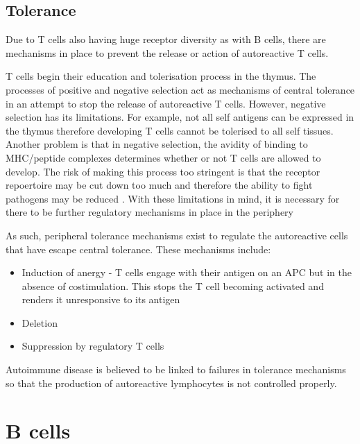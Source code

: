 


\subsection{Tolerance}
\label{subsec:Tcelltolerance}

Due to T cells also having huge receptor diversity as with B cells, there are mechanisms in place to prevent the release or action of autoreactive T cells.

T cells begin their education and tolerisation process in the thymus.
The processes of positive and negative selection act as mechanisms of central tolerance in an attempt to stop the release of autoreactive T cells\citep{Walker2002}.
However, negative selection has its limitations.
For example, not all self antigens can be expressed in the thymus therefore developing T cells cannot be tolerised to all self tissues.
Another problem is that in negative selection, the avidity of binding to MHC/peptide complexes determines whether or not T cells are allowed to develop.
The risk of making this process too stringent is that the receptor repoertoire may be cut down too much and therefore the ability to fight pathogens may be reduced \citep{Walker2002}.
With these limitations in mind, it is necessary for there to be further regulatory mechanisms in place in the periphery

As such, peripheral tolerance mechanisms exist to regulate the autoreactive cells that have escape central tolerance.
These mechanisms include:
\begin{itemize}
\item Induction of anergy - T cells engage with their antigen on an APC but in the absence of costimulation. This stops the T cell becoming activated and renders it unresponsive to its antigen\citep{Abbas2004}
\item Deletion\citep{Abbas2004}
\item Suppression by regulatory T cells\citep{Abbas2004}
\end{itemize}

Autoimmune disease is believed to be linked to failures in tolerance mechanisms so that the production of autoreactive lymphocytes is not controlled properly.

\section{B cells}
